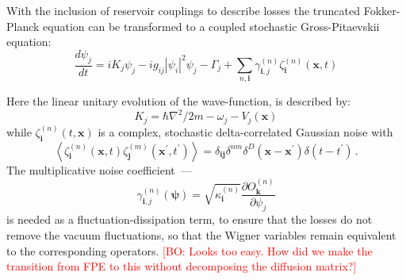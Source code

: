 \documentclass[aps,prl,twocolumn,showpacs,amsmath,amssymb,superscriptaddress]{revtex4-1}
\newcommand{\bogdansremark}[1]{\textcolor{red}{{[}BO: #1{]}}}
\newcommand{\bx}{\boldsymbol{x}}
\begin{document}
With the inclusion of reservoir couplings to describe losses
the truncated Fokker-Planck equation can be transformed
to a coupled stochastic Gross-Pitaevskii equation:
\begin{equation}
	\frac{d\psi_{j}}{dt} = iK_{j} \psi_{j} - ig_{ij} |\psi_{i}|^{2} \psi_{j} - \Gamma_{j} +
		\sum_{n,\mathbf{i}} \gamma_{\mathbf{i},j}^{(n)} \zeta_{\mathbf{i}}^{(n)} (\bx,t)
\end{equation}

Here the linear unitary evolution of the wave-function, is described by:
\begin{equation}
	K_{j} = \hbar \nabla^{2}/2m - \omega_{j} - V_{j} \left( \bx \right)
\end{equation}
while $\zeta_{\mathbf{i}}^{(n)}(t,\bx)$ is a complex,
stochastic delta-correlated Gaussian noise with
\begin{equation}
	\left\langle
		\zeta_{\mathbf{i}}^{(n)} (\bx,t) \zeta_{\mathbf{j}}^{(m)}(\bx^\prime, t^\prime)
	\right\rangle =
	\delta_{\mathbf{ij}} \delta^{nm} \delta^{D} \left(
		\bx - \bx^\prime
	\right)
	\delta \left( t - t^\prime \right)\,.
\end{equation}
The multiplicative noise coefficient~---
\begin{equation}
	\gamma_{\mathbf{i},j}^{(n)} \left( \boldsymbol{\psi} \right) =
	\sqrt{\kappa_{\mathbf{i}}^{(n)}}
	\frac{\partial O_{\mathbf{k}}^{(n)}}{\partial\psi_{j}}
\end{equation}
is needed as a fluctuation-dissipation term,
to ensure that the losses do not remove the vacuum fluctuations,
so that the Wigner variables remain equivalent to the corresponding operators.
	\bogdansremark{Looks too easy. How did we make the transition from FPE to this
	without decomposing the diffusion matrix?}
\end{document}
